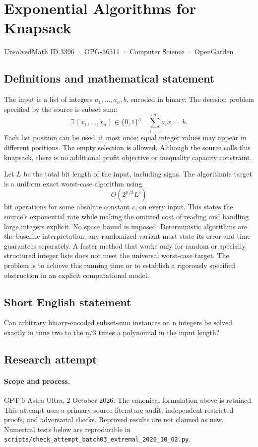 \documentclass[11pt,a4paper]{article}
\begin{document}
\section*{Exponential Algorithms for Knapsack}\label{3396}
{\small UnsolvedMath ID 3396 · OPG-36311 · Computer Science · OpenGarden}
\subsection{Definitions and mathematical statement}
The input is a list of integers $a_1,\ldots,a_n,b$, encoded in binary.
The decision problem specified by the source is subset sum:
\[
 \exists (x_1,\ldots,x_n)\in\{0,1\}^n\quad
                        \sum_{i=1}^n a_ix_i=b.
\]
Each list position can be used at most once; equal integer values
may appear in different positions. The empty selection is allowed.
Although the source calls this knapsack, there is no additional
profit objective or inequality capacity constraint.

Let $L$ be the total bit length of the input, including signs. The
algorithmic target is a uniform exact worst-case algorithm using
\[
                            O(2^{n/3}L^c)
\]
bit operations for some absolute constant $c$, on every input.
This states the source's exponential rate while making the omitted
cost of reading and handling large integers explicit. No space bound
is imposed. Deterministic algorithms are the baseline interpretation;
any randomized variant must state its error and time guarantees
separately. A faster method that works only for random or specially
structured integer lists does not meet the universal worst-case
target. The problem is to achieve this running time or to establish
a rigorously specified obstruction in an explicit computational model.
\subsection{Short English statement}
Can arbitrary binary-encoded subset-sum instances on n integers be solved exactly in time two to the n/3 times a polynomial in the input length?
\subsection{Research attempt}
\paragraph{Scope and process.}
GPT-6 Astra Ultra, 2 October 2026. The canonical formulation above is retained. This attempt uses a primary-source literature audit, independent restricted proofs, and adversarial checks. Reproved results are not claimed as new. Numerical tests below are reproducible in \texttt{scripts/check\_attempt\_batch03\_extremal\_2026\_10\_02.py}.
\end{document}
